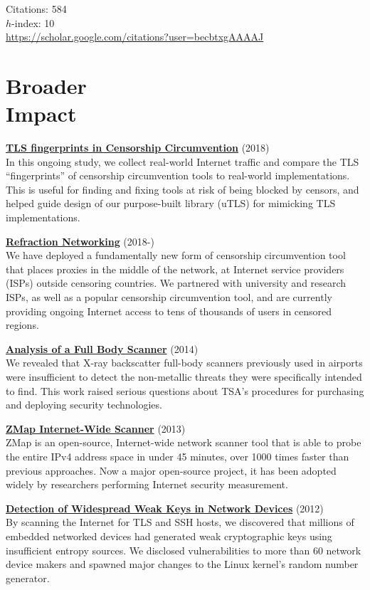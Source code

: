 \documentclass[margin,11pt]{res} %
\begin{document}
Citations: 584\\
$h$-index: 10\\
\url{https://scholar.google.com/citations?user=becbtxgAAAAJ}
\fi


\vspace{6pt}
\section{\large Broader\\Impact}

\textbf{\href{https://tlsfingerprint.io}{TLS fingerprints in Censorship Circumvention}} (2018) \\
In this ongoing study, we collect real-world Internet traffic and compare the TLS ``fingerprints'' of censorship circumvention tools to real-world implementations. This is useful for finding and fixing tools at risk of being blocked by censors, and helped guide design of our purpose-built library (uTLS) for mimicking TLS implementations.

\textbf{\href{https://refraction.network}{Refraction Networking}} (2018-) \\
We have deployed a fundamentally new form of censorship circumvention tool that places proxies in the middle of the network, at Internet service providers (ISPs) outside censoring countries. We partnered with university and research ISPs, as well as a popular censorship circumvention tool, and are currently providing ongoing Internet access to tens of thousands of users in censored regions.

\textbf{\href{https://radsec.org}{Analysis of a Full Body Scanner}} (2014)\\
We revealed that X-ray backscatter full-body scanners previously used in airports were insufficient to detect the non-metallic threats they were specifically intended to find. This work raised serious questions about TSA's procedures for purchasing and deploying security technologies.

\textbf{\href{https://zmap.io/}{ZMap Internet-Wide Scanner}} (2013)\\
ZMap is an open-source, Internet-wide network scanner tool that is able to probe the entire IPv4 address space in under 45 minutes, over 1000 times faster than previous approaches. Now a major open-source project, it has been adopted widely by researchers performing Internet security measurement.

\textbf{\href{https://factorable.net/}{Detection of Widespread Weak Keys in Network Devices}} (2012)\\
By scanning the Internet for TLS and SSH hosts, we discovered that millions of embedded networked devices had generated weak cryptographic keys using insufficient entropy sources. We disclosed vulnerabilities to more than 60 network device makers and spawned major changes to the Linux kernel's random number generator.
\end{document}
